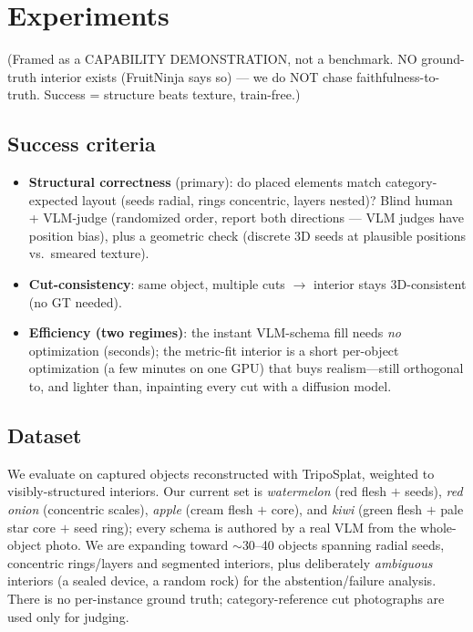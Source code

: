 \documentclass[10pt,twocolumn,letterpaper]{article}
\newcommand{\note}[1]{{\color{teal}\small(#1)}}
\begin{document}
\section{Experiments}
\label{sec:exp}
\note{Framed as a CAPABILITY DEMONSTRATION, not a benchmark. NO
ground-truth interior exists (FruitNinja says so) --- we do NOT chase
faithfulness-to-truth. Success = structure beats texture, train-free.}

\subsection{Success criteria}
\begin{itemize}\itemsep0.1em
  \item \textbf{Structural correctness} (primary): do placed elements
    match category-expected layout (seeds radial, rings concentric,
    layers nested)? Blind human + VLM-judge \note{randomized order,
    report both directions --- VLM judges have position bias}, plus a
    geometric check (discrete 3D seeds at plausible positions vs.\
    smeared texture).
  \item \textbf{Cut-consistency}: same object, multiple cuts $\rightarrow$
    interior stays 3D-consistent (no GT needed).
  \item \textbf{Efficiency (two regimes)}: the instant VLM-schema fill
    needs \emph{no} optimization (seconds); the metric-fit interior is a
    short per-object optimization (a few minutes on one GPU) that buys
    realism---still orthogonal to, and lighter than, inpainting every cut
    with a diffusion model.
\end{itemize}

\subsection{Dataset}
We evaluate on captured objects reconstructed with TripoSplat, weighted
to visibly-structured interiors. Our current set is \emph{watermelon}
(red flesh $+$ seeds), \emph{red onion} (concentric scales), \emph{apple}
(cream flesh $+$ core), and \emph{kiwi} (green flesh $+$ pale star core
$+$ seed ring); every schema is authored by a real VLM from the
whole-object photo. We are expanding toward $\sim$30--40 objects spanning
radial seeds, concentric rings/layers and segmented interiors, plus
deliberately \emph{ambiguous} interiors (a sealed device, a random rock)
for the abstention/failure analysis. There is no per-instance ground
truth; category-reference cut photographs are used only for judging.
\end{document}
